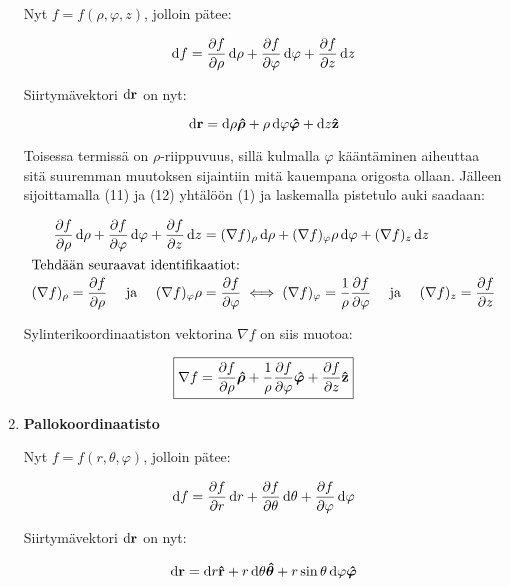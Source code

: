 \documentclass[../johdoksia.tex]{subfiles}
\begin{document}
\begin{enumerate}
		\noindent Nyt $f = f(\rho, \varphi, z)$, jolloin pätee:
		
		\begin{equation}
			\odif{f} = \pdv{f}{\rho}\odif{\rho} + \pdv{f}{\varphi}\odif{\varphi} + \pdv{f}{z}\odif{z}
		\end{equation}
		
		Siirtymävektori $\odif{\vtr{r}}$ on nyt:
		
		\begin{equation}
			\odif{\vtr{r}} = \odif{\rho}\unitg{\rho} + \rho\odif{\varphi}\unitg{\varphi} + \odif{z}\unitv{z}
		\end{equation}
		
		Toisessa termissä on $\rho$-riippuvuus, sillä kulmalla $\varphi$ kääntäminen aiheuttaa sitä suuremman muutoksen sijaintiin mitä kauempana origosta ollaan. Jälleen sijoittamalla (11) ja (12) yhtälöön (1) ja laskemalla pistetulo auki saadaan:
		
		\begin{align}
			\pdv{f}{\rho}\odif{\rho} + \pdv{f}{\varphi}\odif{\varphi} + \pdv{f}{z}\odif{z} &= (\nabla f)_\rho\odif{\rho} + (\nabla f)_\varphi \rho\odif{\varphi} + (\nabla f)_z\odif{z} \\
			\intertext{Tehdään seuraavat identifikaatiot:}
			(\nabla f)_\rho = \pdv{f}{\rho} \ \ \ \ \text{ja} \ \ \ \ (\nabla f)_\varphi \rho &= \pdv{f}{\varphi} \iff (\nabla f)_\varphi = \frac{1}{\rho}\pdv{f}{\varphi} \ \ \ \ \text{ja} \ \ \ \ (\nabla f)_z = \pdv{f}{z}
		\end{align}
		
		\noindent Sylinterikoordinaatiston vektorina $\nabla f$ on siis muotoa:
		
		\begin{equation}
			\boxed{\nabla f = \pdv{f}{\rho}\boldsymbol{\hat{\rho}} + \frac{1}{\rho}\pdv{f}{\varphi}\boldsymbol{\hat{\varphi}} + \pdv{f}{z}\mathbf{\hat{z}}}
		\end{equation}
		
		\item \textbf{Pallokoordinaatisto}
		
		\noindent Nyt $f = f(r, \theta, \varphi)$, jolloin pätee:
		
		\begin{equation}
			\odif{f} = \pdv{f}{r}\odif{r} + \pdv{f}{\theta}\odif{\theta} + \pdv{f}{\varphi}\odif{\varphi}
		\end{equation}
		
		Siirtymävektori $\odif{\vtr{r}}$ on nyt:
		
		\begin{equation}
			\odif{\vtr{r}} = \odif{r}\unitv{r} + r\odif{\theta}\unitg{\theta} + r\sin\theta\odif{\varphi}\unitg{\varphi}
		\end{equation}
		

\end{enumerate}
\end{document}
